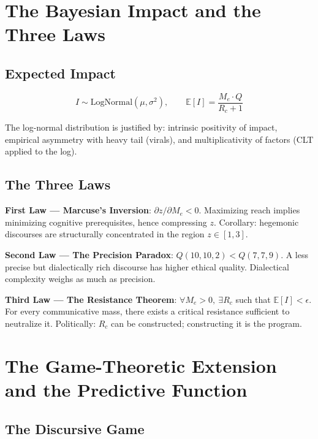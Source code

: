 \section{The Bayesian Impact and the Three
Laws}\label{bayesian-impact-three-laws}

\subsection{Expected Impact}\label{expected-impact}

\[
I \sim \mathrm{LogNormal}(\mu, \sigma^2), \qquad \mathbb{E}[I] = \frac{M_e \cdot Q}{R_c + 1}
\]

The log-normal distribution is justified by: intrinsic positivity of
impact, empirical asymmetry with heavy tail (virals), and
multiplicativity of factors (CLT applied to the log).

\subsection{The Three Laws}\label{three-laws}

\Proved{} \textbf{First Law --- Marcuse's Inversion}:
\(\partial z / \partial M_e < 0\). Maximizing reach implies minimizing
cognitive prerequisites, hence compressing \(z\). Corollary: hegemonic
discourses are structurally concentrated in the region \(z \in [1, 3]\).

\Proved{} \textbf{Second Law --- The Precision Paradox}:
\(Q(10, 10, 2) < Q(7, 7, 9)\). A less precise but dialectically rich
discourse has higher ethical quality. Dialectical complexity weighs as
much as precision.

\Proved{} \textbf{Third Law --- The Resistance Theorem}:
\(\forall M_e > 0,\ \exists R_c\) such that
\(\mathbb{E}[I] < \epsilon\). For every communicative mass, there exists
a critical resistance sufficient to neutralize it. Politically: \(R_c\)
can be constructed; constructing it is the program.

\section{The Game-Theoretic Extension and the Predictive
Function}\label{game-theoretic-extension-predictive-function}

\subsection{The Discursive Game}\label{discursive-game}

